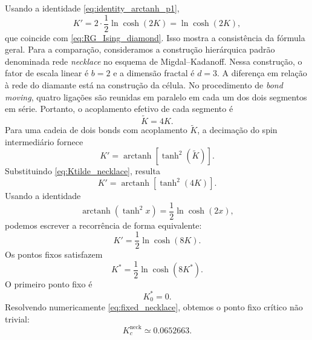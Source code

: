 \documentclass[12pt,a4paper]{article}
\begin{document}
%
Usando a identidade \eqref{eq:identity_arctanh_p1},
%
\begin{equation}
    K'
    =
    2\cdot
    \frac12\ln\cosh(2K)
    =
    \ln\cosh(2K),
\end{equation}
%
que coincide com \eqref{eq:RG_Ising_diamond}. Isso mostra a consistência da fórmula geral.  Para a comparação, consideramos a construção hierárquica padrão denominada rede \textit{necklace} no esquema de Migdal--Kadanoff. Nessa construção, o fator de escala linear é $b=2$ e a dimensão
fractal é $d=3$. A diferença em relação à rede do diamante está na construção da célula. No procedimento de \textit{bond moving}, quatro ligações
são reunidas em paralelo em cada um dos dois segmentos em série.
Portanto, o acoplamento efetivo de cada segmento é
%
\begin{equation}
    \widetilde K=4K.
    \label{eq:Ktilde_necklace}
\end{equation}
%
Para uma cadeia de dois bonds com acoplamento $\widetilde K$, a
decimação do spin intermediário fornece
%
\begin{equation}
    K'
    =
    \operatorname{arctanh}
    \left[
        \tanh^2(\widetilde K)
    \right].
\end{equation}
%
Substituindo \eqref{eq:Ktilde_necklace}, resulta
%
\begin{equation}
    K'
    =
    \operatorname{arctanh}
    \left[
        \tanh^2(4K)
    \right].
    \label{eq:RG_necklace}
\end{equation}
%
Usando a identidade
%
\begin{equation}
    \operatorname{arctanh}(\tanh^2 x)
    =
    \frac12\ln\cosh(2x),
\end{equation}
%
podemos escrever a recorrência de forma equivalente:
%
\begin{equation}
    K'=\frac12\ln\cosh(8K).
    \label{eq:RG_necklace_log}
\end{equation}
%
Os pontos fixos satisfazem
%
\begin{equation}
    K^*=\frac12\ln\cosh(8K^*).
    \label{eq:fixed_necklace}
\end{equation}
%
O primeiro ponto fixo é
%
\begin{equation}
    K_0^*=0.
\end{equation}
%
Resolvendo numericamente \eqref{eq:fixed_necklace}, obtemos
o ponto fixo crítico não trivial:
%
\begin{equation}    K_c^{\mathrm{neck}}\simeq0.0652663.
    \label{eq:Kc_necklace}
\end{equation}
\end{document}
